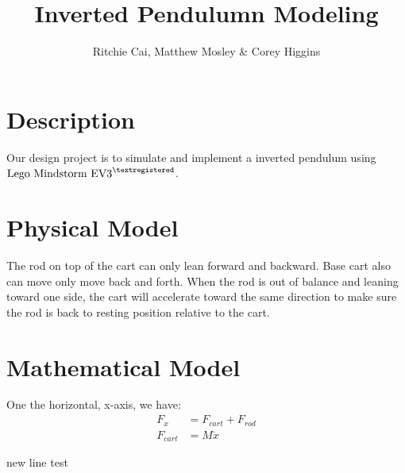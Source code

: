 \documentclass{notes}
\author{Ritchie Cai, Matthew Mosley \& Corey Higgins}
\title{Inverted Pendulumn Modeling}
\begin{document}
\maketitle 

\section{Description}
Our design project is to simulate and implement a inverted pendulum using 
$\text{Lego Mindstorm EV3}^{\textregistered}$. 

\section{Physical Model}


The rod on top of the cart can only lean forward and backward. 
Base cart also can move only move back and forth. 
When the rod is out of balance and leaning toward one side, the cart will accelerate toward the same
direction to make sure the rod is back to resting position relative to the cart.

\section{Mathematical Model}

One the horizontal, x-axis, we have:
\begin{align*}
  F_x & = F_{cart} + F_{rod} \\
  F_{cart} & = M\ddot{x} 
\end{align*}

new line test
\end{document}
